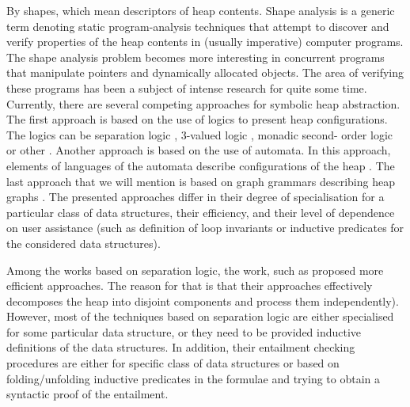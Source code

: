 
By shapes, which mean descriptors of heap contents. Shape analysis is a generic term denoting static
program-analysis techniques that attempt to discover and verify properties of the heap contents in (usually imperative) computer programs. The shape analysis problem becomes more interesting in concurrent programs that manipulate pointers and dynamically allocated objects.  The area  of verifying these programs has been a subject of intense research for quite some time. Currently, there are several competing approaches for symbolic heap abstraction.  The first approach is  based on the use of logics to present heap configurations. The logics can be separation logic \cite{John:SL, Stephen:SL,JoshCris:SL,Hongseok:SL,Kamil:SL,Chin:SL,Quang:SL, Ruzica:SL, Constrantin:SL}, 3-valued logic \cite{SagivRW02}, monadic second- order logic \cite{Ander:ML, Jakob:ML,Madhusudan:ML} or other \cite{Shmuel:Shape, Karen:Shape}. Another approach is based on the use of automata. In this approach, elements of languages of the automata describe configurations of the heap \cite{Ahmed:TreeAutomata, Ahmed:TreeAutomata2}. The last approach that we will mention is based on graph grammars describing heap graphs \cite{Jonathan:Shape, Jonathan:Grammars}. The presented approaches differ in their degree of specialisation for a particular class of data structures, their efficiency, and their level of dependence on user assistance (such as definition of loop invariants or inductive predicates for the considered data structures).
  
Among the works based on separation logic, the work, such as \cite{JoshCris:SL,Hongseok:SL, Quang:SL} proposed more efficient approaches. The reason for that is that their approaches effectively decomposes the heap into disjoint components and process them independently). However, most of the techniques based on separation logic are either specialised for some particular data structure, or they need to be provided inductive definitions of the data structures. In addition, their entailment checking procedures are either for specific class of data structures or based on folding/unfolding inductive predicates in the formulae and trying to obtain a syntactic proof of the entailment. 

